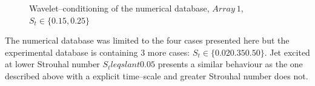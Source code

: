 \documentclass[english]{aiaa-tc}
\begin{document}
\begin{figure}[!ht]
\begin{center}
\begin{centering}
\end{centering}
\caption{Wavelet--conditioning of the numerical database, $Array~1$, $S_t \in \{0.15, 0.25\}$}
\label{fig:numericalConditioning2}
\end{center}
\end{figure}

The numerical database was limited to the four cases presented here but the experimental database is containing 3 more cases: $S_t \in \{ 0.02 0.35 0.50\}$. Jet excited at lower Strouhal number $S_t leqslant 0.05$ presents a similar behaviour as the one described above with a explicit time--scale and greater Strouhal number does not.

\end{document}

